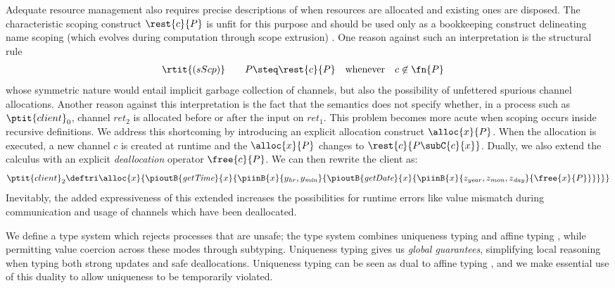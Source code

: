 \documentclass[copyright]{eptcs}
\begin{document}
Adequate resource management also requires precise descriptions of when
resources are allocated and existing ones are disposed.  The characteristic
scoping construct $\rest{c}{P}$ is  unfit for this purpose and should be used
only as a bookkeeping construct delineating name scoping (which evolves during
computation through scope extrusion) . One reason against such an
interpretation  is the structural rule 
\begin{align*}
\rtit{(sScp)} &\qquad P \steq  \rest{c}{P}  \quad \text{whenever}\quad c\not\in\fn{P}
\end{align*}
whose symmetric nature would entail implicit garbage collection of channels,
but also the possibility of unfettered spurious channel allocations. Another
reason against this interpretation is the fact that the \pic semantics does not
specify whether, in a process such as $\ptit{client}_0$, channel
$\textit{ret}_2$ is allocated before or after the input on $\textit{ret}_1$.
This problem becomes more acute when scoping occurs inside recursive
definitions.  We address this shortcoming by introducing an explicit allocation
construct $\alloc{x}{P}$.  When the allocation is executed,  a new channel $c$
is created at runtime and the $\alloc{x}{P}$ changes to
$\rest{c}{P\subC{c}{x}}$.  Dually, we also extend the calculus with an
explicit \emph{deallocation} operator $\free{c}{P}$. We can then rewrite the
client as: 
\begin{equation*}
  \ptit{client}_2 \deftri \alloc{x}{\pioutB{\textit{getTime}}{x}{\piinB{x}{y_\mathit{hr}, y_\mathit{min}}{\pioutB{\textit{getDate}}{x}{\piinB{x}{z_\mathit{year}, z_\mathit{mon}, z_\mathit{day}}{\free{x}{P}}}}}}
\end{equation*}
Inevitably, the added expressiveness of this extended \pic increases the
possibilities for runtime errors like value mismatch during communication and
usage of channels which have been deallocated.  

We define a type system which rejects processes that are unsafe; the type
system combines uniqueness typing \cite{barendsen:functional} and affine typing
\cite{KobayashiPT:linearity}, while permitting value coercion across these
modes through subtyping. Uniqueness typing gives us \emph{global guarantees},
simplifying local reasoning when typing both strong updates and safe
deallocations. Uniqueness typing can be seen as dual to affine typing
\cite{harrington:uniquenesslogic}, and we make essential use of this duality to
allow uniqueness to be temporarily violated.
\end{document}
